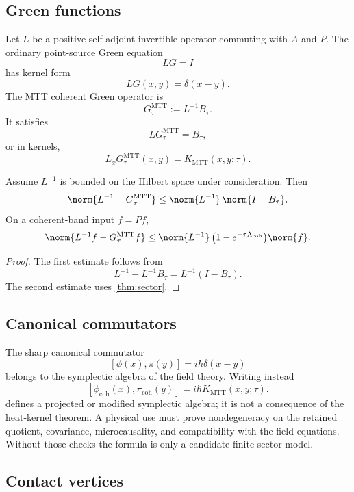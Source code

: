 \documentclass[11pt]{article}
\begin{document}
\subsection{Green functions}

Let \(L\) be a positive self-adjoint invertible operator commuting with \(A\) and \(P\). The
ordinary point-source Green equation
\[
        LG=I
\]
has kernel form
\[
        LG(x,y)=\delta(x-y).
\]
The MTT coherent Green operator is
\[
        G_\tau^{\mathrm{MTT}}:=L^{-1}B_\tau.
\]
It satisfies
\[
        LG_\tau^{\mathrm{MTT}}=B_\tau,
\]
or in kernels,
\[
        L_xG_\tau^{\mathrm{MTT}}(x,y)=K_{\mathrm{MTT}}(x,y;\tau).
\]

\begin{proposition}\label{prop:green}
Assume \(L^{-1}\) is bounded on the Hilbert space under consideration. Then
\[
        \norm{L^{-1}-G_\tau^{\mathrm{MTT}}}
        \le
        \norm{L^{-1}}\,
        \norm{I-B_\tau}.
\]
On a coherent-band input \(f=Pf\),
\[
        \norm{L^{-1}f-G_\tau^{\mathrm{MTT}}f}
        \le
        \norm{L^{-1}}\,
        \bigl(1-e^{-\tau\Lambda_{\mathrm{coh}}}\bigr)\norm{f}.
\]
\end{proposition}

\begin{proof}
The first estimate follows from
\[
        L^{-1}-L^{-1}B_\tau=L^{-1}(I-B_\tau).
\]
The second estimate uses \cref{thm:sector}.
\end{proof}

\subsection{Canonical commutators}

The sharp canonical commutator
\[
        [\phi(x),\pi(y)]=i\hbar\delta(x-y)
\]
belongs to the symplectic algebra of the field theory.  Writing instead
\[
        [\phi_{\mathrm{coh}}(x),\pi_{\mathrm{coh}}(y)]
        =
        i\hbar K_{\mathrm{MTT}}(x,y;\tau).
\]
defines a projected or modified symplectic algebra; it is not a consequence
of the heat-kernel theorem.  A physical use must prove nondegeneracy on the
retained quotient, covariance, microcausality, and compatibility with the
field equations.  Without those checks the formula is only a candidate
finite-sector model.

\subsection{Contact vertices}
\end{document}
